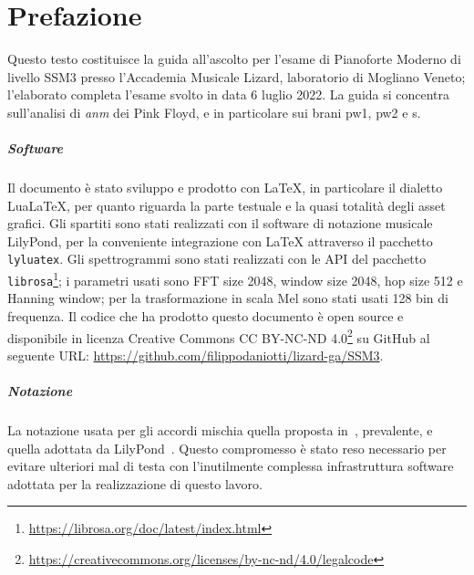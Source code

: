 \documentclass[class=book, crop=false, oneside, 12pt]{standalone}
\begin{document}
\chapter*{Prefazione}

Questo testo costituisce la guida all'ascolto per l'esame di Pianoforte Moderno di livello SSM3 presso l'Accademia Musicale Lizard, laboratorio di Mogliano Veneto; l'elaborato completa l'esame svolto in data 6 luglio 2022. La guida si concentra sull'analisi di \emph{\acrlong{anm}} dei Pink Floyd, e in particolare sui brani \acrlong{pw1}, \acrlong{pw2} e \acrlong{s}.

\paragraph{Software}
Il documento è stato sviluppo e prodotto con LaTeX, in particolare il dialetto LuaLaTeX, per quanto riguarda la parte testuale e la quasi totalità degli asset grafici. Gli spartiti sono stati realizzati con il software di notazione musicale LilyPond, per la conveniente integrazione con LaTeX attraverso il pacchetto \texttt{lyluatex}. Gli spettrogrammi sono stati realizzati con le API del pacchetto \texttt{librosa}\footnote{\url{https://librosa.org/doc/latest/index.html}}; i parametri usati sono FFT size 2048, window size 2048, hop size 512 e Hanning window; per la trasformazione in scala Mel sono stati usati 128 bin di frequenza. Il codice che ha prodotto questo documento è open source e disponibile in licenza Creative Commons CC BY-NC-ND 4.0\footnote{\url{https://creativecommons.org/licenses/by-nc-nd/4.0/legalcode}} su GitHub al seguente URL: \url{https://github.com/filippodaniotti/lizard-ga/SSM3}.

\paragraph{Notazione}
La notazione usata per gli accordi mischia quella proposta in~\cite{brachi2008armonia}, prevalente, e quella adottata da LilyPond~\cite{res:lily-chord-chart}. Questo compromesso è stato reso necessario per evitare ulteriori mal di testa con l'inutilmente complessa infrastruttura software adottata per la realizzazione di questo lavoro.
\end{document}
